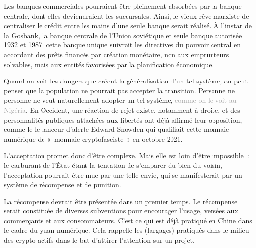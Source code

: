 Les banques commerciales pourraient être pleinement absorbées par la banque centrale, dont elles deviendraient les succursales. Ainsi, le vieux rêve marxiste de centraliser le crédit entre les mains d'une seule banque serait réalisé. À l'instar de la Gosbank, la banque centrale de l'Union soviétique et seule banque autorisée 1932 et 1987, cette banque unique suivrait les directives du pouvoir central en accordant des prêts financés par création monétaire, non aux emprunteurs solvables, mais aux entités favorisées par la planification économique.


Quand on voit les dangers que créent la généralisation d'un tel système, on peut penser que la population ne pourrait pas accepter la transition. Personne ne  personne ne veut naturellement adopter un tel système, \textcolor{darkgray}{comme on le voit au Nigéria}. En Occident, une réaction de rejet existe, notamment à droite, et des personnalités publiques attachées aux libertés ont déjà affirmé leur opposition, comme le le lanceur d'alerte Edward Snowden qui qualifiait cette monnaie numérique de «~monnaie cryptofasciste~» en octobre 2021.

%
L'acceptation promet donc d'être complexe. Mais elle est loin d'être impossible~: le carburant de l'État étant la tentation de s'emparer du bien du voisin, l'acceptation pourrait être mue par une telle envie, qui se manifesterait par un système de récompense et de punition.

La récompense devrait être présentée dans un premier temps. Le récompense serait constituée de diverses subventions pour encourager l'usage, versées aux commerçants et aux consommateurs. C'est ce qui est déjà pratiqué en Chine dans le cadre du yuan numérique. Cela rappelle les  (largages) pratiqués dans le milieu des crypto-actifs dans le but d'attirer l'attention sur un projet.

